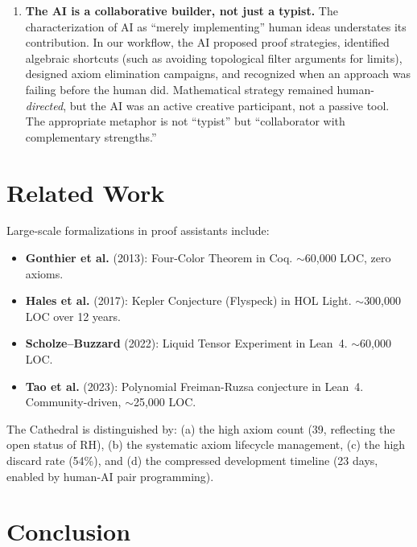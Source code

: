 \documentclass[11pt,a4paper]{article}
\theoremstyle{definition}
\begin{document}
\begin{enumerate}
  \item \textbf{The AI is a collaborative builder, not just a typist.}
    The characterization of AI as ``merely implementing'' human ideas
    understates its contribution. In our workflow, the AI proposed
    proof strategies, identified algebraic shortcuts (such as avoiding
    topological filter arguments for limits), designed axiom elimination
    campaigns, and recognized when an approach was failing before the
    human did. Mathematical strategy remained human-\emph{directed},
    but the AI was an active creative participant, not a passive tool.
    The appropriate metaphor is not ``typist'' but ``collaborator with
    complementary strengths.''
\end{enumerate}

\section{Related Work}

Large-scale formalizations in proof assistants include:

\begin{itemize}
  \item \textbf{Gonthier et al.} (2013): Four-Color Theorem in Coq.
    $\sim$60,000 LOC, zero axioms.
  \item \textbf{Hales et al.} (2017): Kepler Conjecture (Flyspeck)
    in HOL Light. $\sim$300,000 LOC over 12 years.
  \item \textbf{Scholze--Buzzard} (2022): Liquid Tensor Experiment
    in Lean~4. $\sim$60,000 LOC.
  \item \textbf{Tao et al.} (2023): Polynomial Freiman-Ruzsa
    conjecture in Lean~4. Community-driven, $\sim$25,000 LOC.
\end{itemize}

The Cathedral is distinguished by: (a) the high axiom count (39,
reflecting the open status of RH), (b) the systematic axiom
lifecycle management, (c) the high discard rate (54\%), and
(d) the compressed development timeline (23 days, enabled by
human-AI pair programming).

\section{Conclusion}
\end{document}
